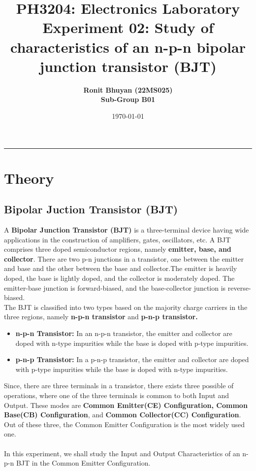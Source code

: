 \documentclass[12pt]{article}
\title{
  \vspace{-2cm}
  \Huge \textbf{PH3204: Electronics Laboratory} \\[0.4cm]
  \Large \textbf{Experiment 02: Study of characteristics of an n-p-n bipolar junction transistor (BJT)}
}
\author{
  \textbf{Ronit Bhuyan (22MS025)} \\[0.2cm]
  \textbf{Sub-Group B01}
}
\date{\today}
\begin{document}
\maketitle

\tableofcontents
\noindent\rule{\textwidth}{0.4pt}
\newpage

\section{Theory}
\subsection{Bipolar Juction Transistor (BJT)}
A \textbf{Bipolar Junction Transistor (BJT)} is a three-terminal device having wide applications in the construction of amplifiers, gates, oscillators, etc. A BJT comprises three doped semiconductor regions, namely \textbf{emitter, base, and collector}. 
There are two p-n junctions in a transistor, one between the emitter and base and the other between the base and collector.The emitter is heavily doped, the base is lightly doped, and the collector is moderately doped. The emitter-base junction is forward-biased, and the base-collector junction is reverse-biased.\\
The BJT is classified into two types based on the majority charge carriers in the three regions, namely \textbf{n-p-n transistor }and \textbf{p-n-p transistor.}
\begin{itemize}
  \item \textbf{n-p-n Transistor:} In an n-p-n transistor, the emitter and collector are doped with n-type impurities while the base is doped with p-type impurities.
  \item \textbf{p-n-p Transistor:} In a p-n-p transistor, the emitter and collector are doped with p-type impurities while the base is doped with n-type impurities.
\end{itemize}
Since, there are three terminals in a transistor, there exists three possible of operations, where one of the three terminals is common to both Input and Output. These modes are \textbf{Common Emitter(CE) Configuration, Common Base(CB) Configuration}, and \textbf{Common Collector(CC) Configuration}. Out of these three, the Common Emitter Configuration is the most widely used one.\\
\\
In this experiment, we shall study the Input and Output Characteristics of an n-p-n BJT in the Common Emitter Configuration.
\end{document}
